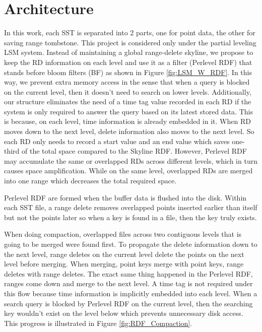 \documentclass[sigconf]{acmart}
\begin{document}
\section{Architecture }
\quad 
\quad In this work, each SST is separated into 2 parts, one for point data, the other for saving range tombstone. This project is considered only under the partial leveling LSM system. Instead of maintaining a global range-delete skyline, we propose to keep the RD information on each level and use it as a filter (Perlevel RDF) that stands before bloom filters (BF) as shown in  Figure \ref{fig:LSM_W_RDF}. In this way, we prevent extra memory access in the sense that when a query is blocked on the current level, then it doesn't need to search on lower levels. Additionally, our structure eliminates the need of a time tag value recorded in each RD if the system is only required to answer the query based on its latest stored data. This is because, on each level, time information is already embedded in it. When RD moves down to the next level, delete information also moves to the next level. So each RD only needs to record a start value and an end value which saves one-third of the total space compared to the Skyline RDF. However, Perlevel RDF may accumulate the same or overlapped RDs across different levels, which in turn causes space amplification. While on the same level, overlapped RDs are merged into one range which decreases the total required space.




Perlevel RDF are formed when the buffer data is flushed into the disk. Within each SST file, a range delete removes overlapped points inserted earlier than itself but not the points later so when a key is found in a file, then the key truly exists.  


When doing compaction, overlapped files across two contiguous levels that is going to be merged were found first. To propagate the delete information down to the next level, range deletes on the current level delete the points on the next level before merging. When merging, point keys merge with point keys, range deletes with range deletes. The exact same thing happened in the Perlevel RDF, ranges come down and merge to the next level.  A time tag is not required under this flow because time information is implicitly embedded into each level.  When a search query is blocked by Perlevel RDF on the current level, then the searching key wouldn't exist on the level below which prevents unnecessary disk access.   This progress is illustrated in Figure \ref{fig:RDF_Compaction}.
\end{document}
